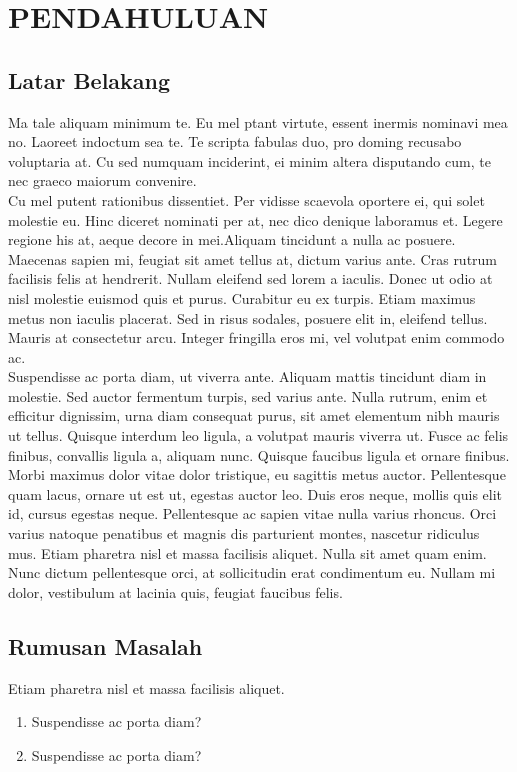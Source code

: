 \chapter{PENDAHULUAN}
\section{Latar Belakang}
Ma tale aliquam minimum te. Eu mel ptant virtute, essent inermis nominavi mea no. Laoreet indoctum sea te. Te scripta fabulas duo, pro doming recusabo voluptaria at. Cu sed numquam inciderint, ei minim altera disputando cum, te nec graeco maiorum convenire.\\
Cu mel putent rationibus dissentiet. Per vidisse scaevola oportere ei, qui solet molestie eu. Hinc diceret nominati per at, nec dico denique laboramus et. Legere regione his at, aeque decore in mei.Aliquam tincidunt a nulla ac posuere. Maecenas sapien mi, feugiat sit amet tellus at, dictum varius ante. Cras rutrum facilisis felis at hendrerit. Nullam eleifend sed lorem a iaculis. Donec ut odio at nisl molestie euismod quis et purus. Curabitur eu ex turpis. Etiam maximus metus non iaculis placerat. Sed in risus sodales, posuere elit in, eleifend tellus. Mauris at consectetur arcu. Integer fringilla eros mi, vel volutpat enim commodo ac.\\

Suspendisse ac porta diam, ut viverra ante. Aliquam mattis tincidunt diam in molestie. Sed auctor fermentum turpis, sed varius ante. Nulla rutrum, enim et efficitur dignissim, urna diam consequat purus, sit amet elementum nibh mauris ut tellus. Quisque interdum leo ligula, a volutpat mauris viverra ut. Fusce ac felis finibus, convallis ligula a, aliquam nunc. Quisque faucibus ligula et ornare finibus. Morbi maximus dolor vitae dolor tristique, eu sagittis metus auctor. Pellentesque quam lacus, ornare ut est ut, egestas auctor leo. Duis eros neque, mollis quis elit id, cursus egestas neque. Pellentesque ac sapien vitae nulla varius rhoncus. Orci varius natoque penatibus et magnis dis parturient montes, nascetur ridiculus mus. Etiam pharetra nisl et massa facilisis aliquet. Nulla sit amet quam enim. Nunc dictum pellentesque orci, at sollicitudin erat condimentum eu. Nullam mi dolor, vestibulum at lacinia quis, feugiat faucibus felis.\\

\section{Rumusan Masalah}
Etiam pharetra nisl et massa facilisis aliquet.
\begin{enumerate}[nolistsep,leftmargin=0.5cm]
  \item Suspendisse ac porta diam?
  \item Suspendisse ac porta diam?\\
\end{enumerate}

